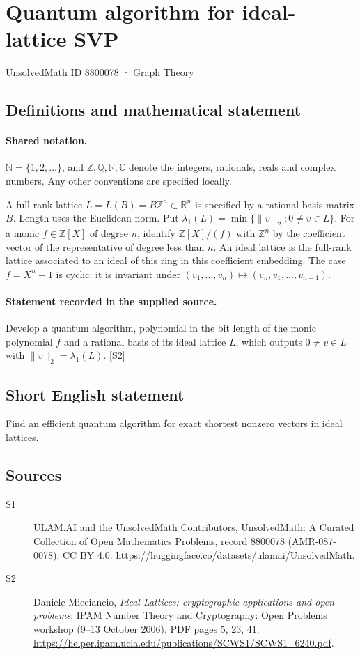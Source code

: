 \documentclass[11pt]{article}
\newcommand{\sref}[2]{\hyperlink{source:#1:#2}{[S#2]}}
\begin{document}
\setcounter{section}{8800077}
\section{Quantum algorithm for ideal-lattice SVP}\label{8800078}
{\small\sffamily UnsolvedMath ID 8800078 · Graph Theory}
\subsection{Definitions and mathematical statement}

\paragraph{Shared notation.}$\mathbb N=\{1,2,\ldots\}$, and $\mathbb Z,\mathbb Q,\mathbb R,\mathbb C$ denote the integers, rationals, reals and complex numbers. Any other conventions are specified locally.


A full-rank lattice $L=L(B)=B\mathbb Z^n\subset\mathbb R^n$ is specified by a rational basis matrix $B$. Length uses the Euclidean norm. Put $\lambda_1(L)=\min\{\|v\|_2:0\ne v\in L\}$. For a monic $f\in\mathbb Z[X]$ of degree $n$, identify $\mathbb Z[X]/(f)$ with $\mathbb Z^n$ by the coefficient vector of the representative of degree less than $n$. An ideal lattice is the full-rank lattice associated to an ideal of this ring in this coefficient embedding. The case $f=X^n-1$ is cyclic: it is invariant under $(v_1,\ldots,v_n)\mapsto(v_n,v_1,\ldots,v_{n-1})$.
\paragraph{Statement recorded in the supplied source.}
Develop a quantum algorithm, polynomial in the bit length of the monic polynomial $f$ and a rational basis of its ideal lattice $L$, which outputs $0\ne v\in L$ with $\|v\|_2=\lambda_1(L)$. \sref{8800078}{2}

\subsection{Short English statement}
Find an efficient quantum algorithm for exact shortest nonzero vectors in ideal lattices.
\subsection{Sources}
\begin{description}
\item[\hypertarget{source:8800078:1}{S1}] ULAM.AI and the UnsolvedMath Contributors, UnsolvedMath: A Curated Collection of Open Mathematics Problems, record 8800078 (AMR-087-0078). CC BY 4.0. \url{https://huggingface.co/datasets/ulamai/UnsolvedMath}.
\item[\hypertarget{source:8800078:2}{S2}] Daniele Micciancio, \emph{Ideal Lattices: cryptographic applications and open problems}, IPAM Number Theory and Cryptography: Open Problems workshop (9--13 October 2006), PDF pages 5, 23, 41. \url{https://helper.ipam.ucla.edu/publications/SCWS1/SCWS1_6240.pdf}.
\end{description}
\label{end:8800078}
\end{document}
